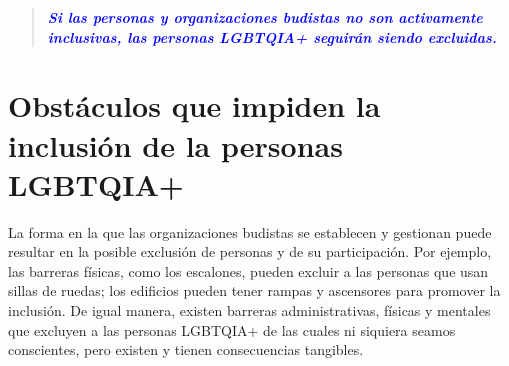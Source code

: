 \documentclass[12pt,openany]{book}
\begin{document}
\newpage
\thispagestyle{empty}
\begin{figure}[h]
    \centering
\end{figure}

\begin{quote}
\centering
\doublespacing
\textit{\Large \textcolor{blue}{\textbf{Si las personas y organizaciones budistas no son activamente inclusivas, las personas LGBTQIA+ seguirán siendo excluidas.}}}
\end{quote}

\chapter*{Obstáculos que impiden la inclusión de la personas LGBTQIA+}

La forma en la que las organizaciones budistas se establecen y gestionan puede resultar en la posible exclusión de personas y de su participación. Por ejemplo, las barreras físicas, como los escalones, pueden excluir a las personas que usan sillas de ruedas; los edificios pueden tener rampas y ascensores para promover la inclusión. De igual manera, existen barreras administrativas, físicas y mentales que excluyen a las personas LGBTQIA+ de las cuales ni siquiera seamos conscientes, pero existen y tienen consecuencias tangibles.
\end{document}
